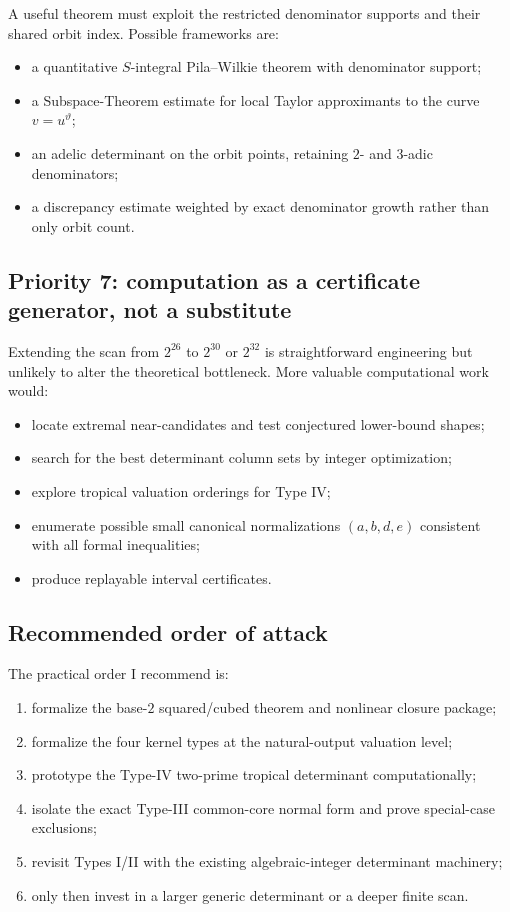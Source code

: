 \documentclass[11pt,oneside]{article}
\theoremstyle{definition}
\theoremstyle{remark}
\begin{document}
A useful theorem must exploit the restricted denominator supports and their shared orbit
index.  Possible frameworks are:

\begin{itemize}
\item a quantitative $S$-integral Pila--Wilkie theorem with denominator support;
\item a Subspace-Theorem estimate for local Taylor approximants to the curve
      $v=u^{\vartheta}$;
\item an adelic determinant on the orbit points, retaining $2$- and $3$-adic denominators;
\item a discrepancy estimate weighted by exact denominator growth rather than only orbit
      count.
\end{itemize}

\subsection{Priority 7: computation as a certificate generator, not a substitute}

Extending the scan from $2^{26}$ to $2^{30}$ or $2^{32}$ is straightforward engineering but
unlikely to alter the theoretical bottleneck.  More valuable computational work would:

\begin{itemize}
\item locate extremal near-candidates and test conjectured lower-bound shapes;
\item search for the best determinant column sets by integer optimization;
\item explore tropical valuation orderings for Type IV;
\item enumerate possible small canonical normalizations $(a,b,d,e)$ consistent with all
      formal inequalities;
\item produce replayable interval certificates.
\end{itemize}

\subsection{Recommended order of attack}

The practical order I recommend is:

\begin{enumerate}
\item formalize the base-$2$ squared/cubed theorem and nonlinear closure package;
\item formalize the four kernel types at the natural-output valuation level;
\item prototype the Type-IV two-prime tropical determinant computationally;
\item isolate the exact Type-III common-core normal form and prove special-case exclusions;
\item revisit Types I/II with the existing algebraic-integer determinant machinery;
\item only then invest in a larger generic determinant or a deeper finite scan.
\end{enumerate}
\end{document}
